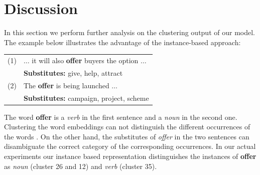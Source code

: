 \section{Discussion}
\label{sec:discuss}

In this section we perform further analysis on the clustering output of our
model.  The example below illustrates the advantage of the
instance-based approach:

     \begin{tabular}{ll}
      (1) & $\hdots$ it will also {\bf offer} buyers the option $\hdots$\\
      &{\bf Substitutes:} give, help, attract\\ 
      (2) & The {\bf offer} is being launched $\hdots$\\ 
      &{\bf Substitutes:} campaign, project, scheme\\ 
    \end{tabular}

The word {\bf offer} is a {\em verb} in the first sentence and a {\em
  noun} in the second one.  Clustering the word embeddings can not
distinguish the different occurrences of the words
\cite{yatbaz-sert-yuret:2012:EMNLP-CoNLL}.  On the other hand, the
substitutes of {\em offer} in the two sentences can disambiguate the
correct category of the corresponding occurrences.  In our actual
experiments our instance based representation distinguishes the
instances of {\bf offer} as {\em noun} (cluster 26 and 12) and {\em
  verb} (cluster 35).

